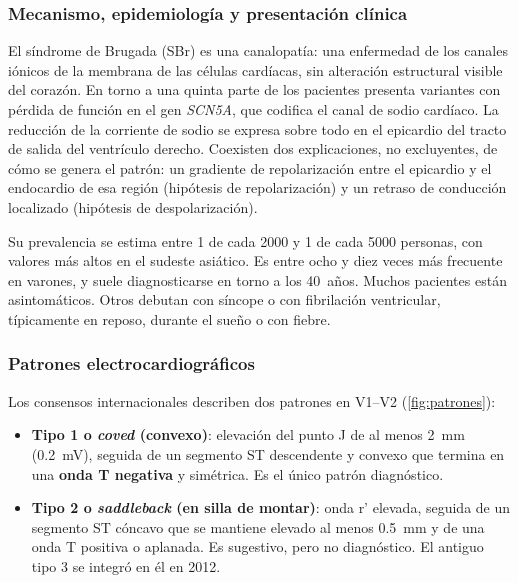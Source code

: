 \subsubsection{Mecanismo, epidemiología y presentación clínica}

El síndrome de Brugada (SBr) es una canalopatía: una enfermedad de los canales iónicos de la membrana de las células cardíacas, sin alteración estructural visible del corazón. En torno a una quinta parte de los pacientes presenta variantes con pérdida de función en el gen \emph{SCN5A}, que codifica el canal de sodio cardíaco. La reducción de la corriente de sodio se expresa sobre todo en el epicardio del tracto de salida del ventrículo derecho. Coexisten dos explicaciones, no excluyentes, de cómo se genera el patrón: un gradiente de repolarización entre el epicardio y el endocardio de esa región (hipótesis de repolarización) y un retraso de conducción localizado (hipótesis de despolarización).

Su prevalencia se estima entre 1 de cada \num{2000} y 1 de cada \num{5000} personas, con valores más altos en el sudeste asiático. Es entre ocho y diez veces más frecuente en varones, y suele diagnosticarse en torno a los 40~años. Muchos pacientes están asintomáticos. Otros debutan con síncope o con fibrilación ventricular, típicamente en reposo, durante el sueño o con fiebre.

\subsubsection{Patrones electrocardiográficos}

Los consensos internacionales describen dos patrones en V1--V2 (\cref{fig:patrones}):

\begin{itemize}
  \item \textbf{Tipo 1 o \emph{coved} (convexo)}: elevación del punto J de al menos \SI{2}{\milli\metre} (\SI{0.2}{\milli\volt}), seguida de un segmento ST descendente y convexo que termina en una \textbf{onda T negativa} y simétrica. Es el único patrón diagnóstico.
  \item \textbf{Tipo 2 o \emph{saddleback} (en silla de montar)}: onda r' elevada, seguida de un segmento ST cóncavo que se mantiene elevado al menos \SI{0.5}{\milli\metre} y de una onda T positiva o aplanada. Es sugestivo, pero no diagnóstico. El antiguo tipo 3 se integró en él en 2012.
\end{itemize}


